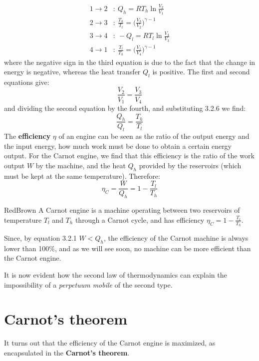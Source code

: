 \documentclass[a4paper,11pt,oneside]{book}
\begin{document}
\begin{align}
    1\rightarrow 2&: \ Q_h = RT_h \ln \frac{V_2}{V_1}\\
    2\rightarrow 3&: \ \frac{T_h}{T_l}=\Big(\frac{V_3}{V_2}\Big)^{\gamma -1}\\
    3\rightarrow 4&: \ -Q_l = RT_l \ln \frac{V_4}{V_3}\\
    4\rightarrow 1&: \ \frac{T_l}{T_h}=\Big(\frac{V_1}{V_4}\Big)^{\gamma -1}
\end{align}
where the negative sign in the third equation is due to the fact that the change in energy is negative, whereas the heat transfer $Q_l$ is positive. The first and second equations give:
\begin{equation}
    \frac{V_2}{V_1}=\frac{V_3}{V_4}
\end{equation}
and dividing the second equation by the fourth, and substituting 3.2.6 we find:
\begin{equation}
    \frac{Q_h}{Q_l}=\frac{T_h}{T_l}
\end{equation}
The \textbf{efficiency} $\eta$ of an engine can be seen as the ratio of the output energy and the input energy, how much work must be done to obtain a certain energy output. For the Carnot engine, we find that this efficiency is the ratio of the work output $W$ by the machine, and the heat $Q_h$ provided by the reservoirs (which must be kept at the same temperature). Therefore:
\begin{equation}
    \eta_C=\frac{W}{Q_h}=1-\frac{T_l}{T_h}
\end{equation}
\begin{mybox}{RedBrown}{\textbf{}}
A Carnot engine is a machine operating between two reservoirs of temperature $T_l$ and $T_h$ through a Carnot cycle, and has efficiency $\eta_C=1-\frac{T_l}{T_h}$.
\end{mybox}
Since, by equation 3.2.1 $W<Q_h$, the efficiency of the Carnot machine is always lower than 100$\%$, and as we will see soon, no machine can be more efficient than the Carnot engine. 

It is now evident how the second law of thermodynamics can explain the impossibility of a \textit{perpetuum mobile} of the second type. 
\section{Carnot's theorem}
It turns out that the efficiency of the Carnot engine is maximized, as encapsulated in the \textbf{Carnot's theorem}.
\end{document}
